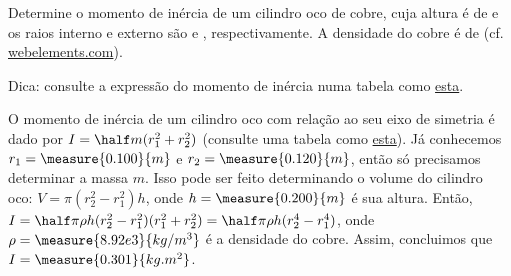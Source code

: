 \begin{question}
    Determine o momento de inércia de um cilindro oco de cobre, cuja altura é de  e os raios interno e externo são  e , respectivamente.
    A densidade do cobre é de  (cf. \href{https://www.webelements.com/copper/}{webelements.com}).

    \begin{compactdesc}
      \item[Dica:] consulte a expressão do momento de inércia numa tabela como \href{https://en.wikipedia.org/wiki/List_of_moments_of_inertia}{esta}.
    \end{compactdesc}

    \begin{answer}
    \end{answer}

    \begin{solution}
      O momento de inércia de um cilindro oco com relação ao seu eixo de simetria é dado por $I = \half m (r_1^2 + r_2^2)$ (consulte uma tabela como \href{https://en.wikipedia.org/wiki/List_of_moments_of_inertia}{esta}).
      Já conhecemos $r_1 = \measure{0.100}{m}$ e $r_2 = \measure{0.120}{m}$, então só precisamos determinar a massa $m$.
      Isso pode ser feito determinando o volume do cilindro oco: $V = \pi (r_2^2 - r_1^2) h$, onde $h = \measure{0.200}{m}$ é sua altura.
      Então, $I = \half \pi \rho h (r_2^2 - r_1^2) (r_1^2 + r_2^2) = \half \pi \rho h (r_2^4 - r_1^4)$, onde $\rho = \measure{8.92e3}{kg/m^3}$ é a densidade do cobre.
      Assim, concluimos que $I = \measure{0.301}{kg.m^2}$.
    \end{solution}
\end{question}